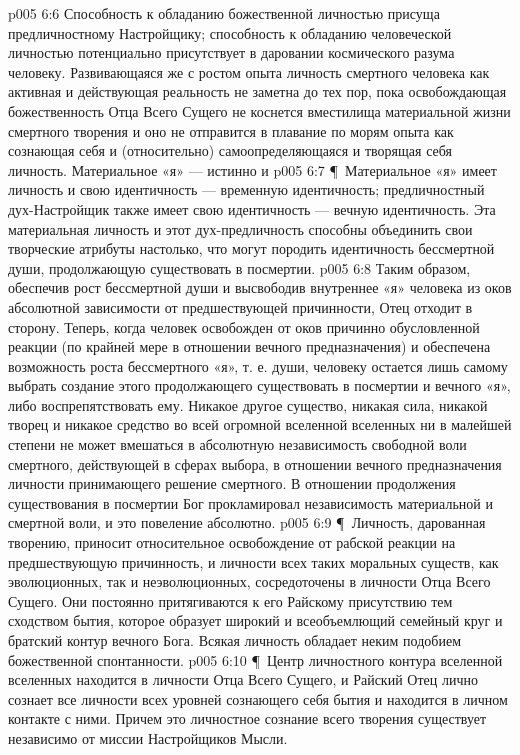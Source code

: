 \vs p005 6:6 Способность к обладанию божественной личностью присуща предличностному Настройщику; способность к обладанию человеческой личностью потенциально присутствует в даровании космического разума человеку. Развивающаяся же с ростом опыта личность смертного человека как активная и действующая реальность не заметна до тех пор, пока освобождающая божественность Отца Всего Сущего не коснется вместилища материальной жизни смертного творения и оно не отправится в плавание по морям опыта как сознающая себя и (относительно) самоопределяющаяся и творящая себя личность. Материальное «я» --- истинно и 
\vs p005 6:7 \P\ Материальное «я» имеет личность и свою идентичность --- временную идентичность; предличностный дух\hyp{}Настройщик также имеет свою идентичность --- вечную идентичность. Эта материальная личность и этот дух\hyp{}предличность способны объединить свои творческие атрибуты настолько, что могут породить идентичность бессмертной души, продолжающую существовать в посмертии.
\vs p005 6:8 Таким образом, обеспечив рост бессмертной души и высвободив внутреннее «я» человека из оков абсолютной зависимости от предшествующей причинности, Отец отходит в сторону. Теперь, когда человек освобожден от оков причинно обусловленной реакции (по крайней мере в отношении вечного предназначения) и обеспечена возможность роста бессмертного «я», т. е. души, человеку остается лишь самому выбрать создание этого продолжающего существовать в посмертии и вечного «я», либо воспрепятствовать ему. Никакое другое существо, никакая сила, никакой творец и никакое средство во всей огромной вселенной вселенных ни в малейшей степени не может вмешаться в абсолютную независимость свободной воли смертного, действующей в сферах выбора, в отношении вечного предназначения личности принимающего решение смертного. В отношении продолжения существования в посмертии Бог прокламировал независимость материальной и смертной воли, и это повеление абсолютно.
\vs p005 6:9 \P\ Личность, дарованная творению, приносит относительное освобождение от рабской реакции на предшествующую причинность, и личности всех таких моральных существ, как эволюционных, так и неэволюционных, сосредоточены в личности Отца Всего Сущего. Они постоянно притягиваются к его Райскому присутствию тем сходством бытия, которое образует широкий и всеобъемлющий семейный круг и братский контур вечного Бога. Всякая личность обладает неким подобием божественной спонтанности.
\vs p005 6:10 \P\ Центр личностного контура вселенной вселенных находится в личности Отца Всего Сущего, и Райский Отец лично сознает все личности всех уровней сознающего себя бытия и находится в личном контакте с ними. Причем это личностное сознание всего творения существует независимо от миссии Настройщиков Мысли.
